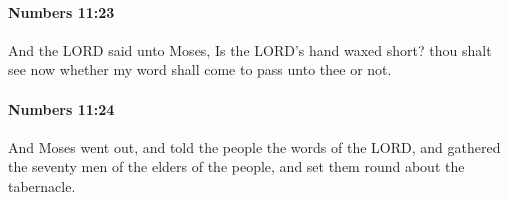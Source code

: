 		\paragraph{Numbers 11:23} %
			\label{NUMBERS-11-23}

			And the LORD said unto Moses, Is the LORD’s hand waxed short? thou shalt see now whether my word shall come to pass unto thee or not.


		\paragraph{Numbers 11:24} %
			\label{NUMBERS-11-24}

			And Moses went out, and told the people the words of the LORD, and gathered the seventy men of the elders of the people, and set them round about the tabernacle.


